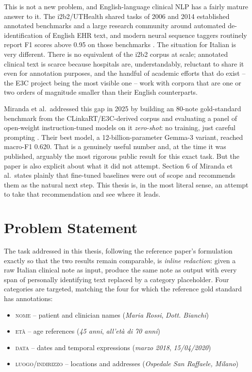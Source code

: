 \documentclass[12pt,a4paper]{report}
\newcommand{\NOME}{\textsc{nome}}
\newcommand{\ETA}{\textsc{et\`a}}
\newcommand{\DATA}{\textsc{data}}
\newcommand{\LUOGO}{\textsc{luogo\slash indirizzo}}
\begin{document}
This is not a new problem, and English-language clinical NLP has a fairly mature answer to it. The i2b2/UTHealth shared tasks of 2006 and 2014 established annotated benchmarks and a large research community around automated de-identification of English EHR text, and modern neural sequence taggers routinely report F1 scores above 0.95 on those benchmarks \citep{stubbs2015automated,dernoncourt2017deidentification}. The situation for Italian is very different. There is no equivalent of the i2b2 corpus at scale; annotated clinical text is scarce because hospitals are, understandably, reluctant to share it even for annotation purposes, and the handful of academic efforts that do exist -- the E3C project being the most visible one \citep{magnini2020e3c} -- work with corpora that are one or two orders of magnitude smaller than their English counterparts.

Miranda et al.\ addressed this gap in 2025 by building an 80-note gold-standard benchmark from the CLinkaRT/E3C-derived corpus and evaluating a panel of open-weight instruction-tuned models on it \emph{zero-shot}: no training, just careful prompting \citep{miranda2025mamma}. Their best model, a 12-billion-parameter Gemma-3 variant, reached macro-F1 0.620. That is a genuinely useful number and, at the time it was published, arguably the most rigorous public result for this exact task. But the paper is also explicit about what it did not attempt. Section 6 of Miranda et al.\ states plainly that fine-tuned baselines were out of scope and recommends them as the natural next step. This thesis is, in the most literal sense, an attempt to take that recommendation and see where it leads.

\section{Problem Statement}

The task addressed in this thesis, following the reference paper's formulation exactly so that the two results remain comparable, is \emph{inline redaction}: given a raw Italian clinical note as input, produce the same note as output with every span of personally identifying text replaced by a category placeholder. Four categories are targeted, matching the four for which the reference gold standard has annotations:

\begin{itemize}[nosep]
  \item \NOME{} -- patient and clinician names (\emph{Maria Rossi}, \emph{Dott. Bianchi})
  \item \ETA{} -- age references (\emph{45 anni}, \emph{all'et\`a di 70 anni})
  \item \DATA{} -- dates and temporal expressions (\emph{marzo 2018}, \emph{15/04/2020})
  \item \LUOGO{} -- locations and addresses (\emph{Ospedale San Raffaele, Milano})
\end{itemize}
\end{document}
